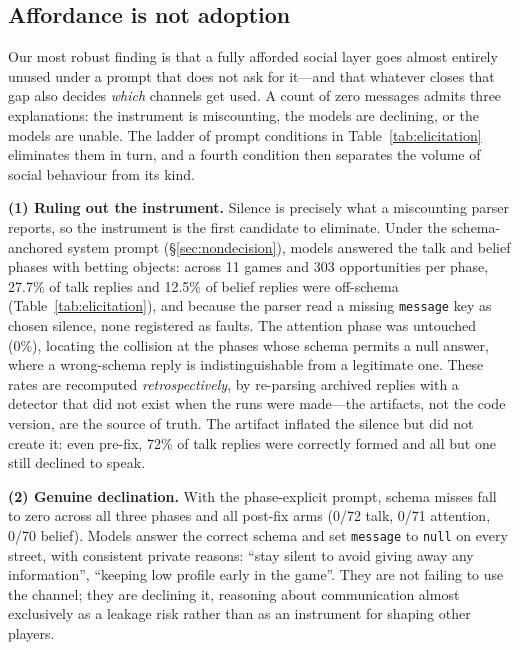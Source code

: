 \documentclass{article}
\begin{document}
\subsection{Affordance is not adoption}
\label{sec:elicitation}

Our most robust finding is that a fully afforded social layer goes almost
entirely unused under a prompt that does not ask for it---and that whatever
closes that gap also decides \emph{which} channels get used. A count of zero
messages admits three explanations: the instrument is miscounting, the models
are declining, or the models are unable. The ladder of prompt conditions in
Table~\ref{tab:elicitation} eliminates them in turn, and a fourth condition
then separates the volume of social behaviour from its kind.

\textbf{(1) Ruling out the instrument.} Silence is precisely what a
miscounting parser reports, so the instrument is the first candidate to
eliminate. Under the schema-anchored system prompt
(\S\ref{sec:nondecision}), models answered the talk and belief phases with
betting objects: across 11 games and 303 opportunities per phase, 27.7\% of
talk replies and 12.5\% of belief replies were off-schema
(Table~\ref{tab:elicitation}), and because the parser read a missing
\texttt{message} key as chosen silence, none registered as faults. The
attention phase was untouched (0\%), locating the collision at the phases
whose schema permits a null answer, where a wrong-schema reply is
indistinguishable from a legitimate one. These rates are recomputed
\emph{retrospectively}, by re-parsing archived replies with a detector that
did not exist when the runs were made---the artifacts, not the code
version, are the source of truth. The artifact inflated the silence but did
not create it: even pre-fix, 72\% of talk replies were correctly formed and
all but one still declined to speak.

\textbf{(2) Genuine declination.} With the phase-explicit prompt, schema
misses fall to zero across all three phases and all post-fix arms (0/72
talk, 0/71 attention, 0/70 belief). Models answer the correct schema and
set \texttt{message} to \texttt{null} on every street, with consistent
private reasons: ``stay silent to avoid giving away any information'',
``keeping low profile early in the game''. They are not failing to use the
channel; they are declining it, reasoning about communication almost
exclusively as a leakage risk rather than as an instrument for shaping
other players.
\end{document}
